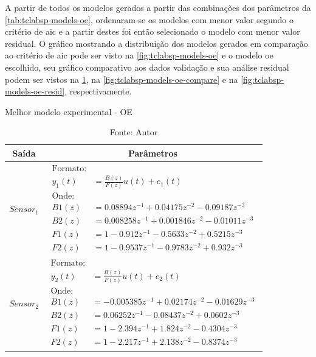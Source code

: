 A partir de todos os modelos gerados a partir das combinações dos parâmetros da \cref{tab:tclabsp-models-oe},
ordenaram-se os modelos com menor valor segundo o critério de \acrshort{aic} e a partir destes foi então
selecionado o modelo com menor valor residual.
O gráfico mostrando a distribuição dos modelos gerados em comparação ao critério de \acrshort{aic} pode ser
visto na \cref{fig:tclabsp-models-oe} e o modelo \acrshort{oe} escolhido, seu gráfico comparativo aos dados validação
e sua análise residual podem ser vistos na \cref{tab:tclabsp-model-oe}, na \cref{fig:tclabsp-models-oe-compare} e na
\cref{fig:tclabsp-models-oe-resid}, respectivamente.

\begin{table}[h]
	\centering
	\caption{Melhor modelo experimental - OE}
	\label{tab:tclabsp-model-oe}
	\begin{tabular}{c|c} \toprule
		{Saída}			&	{Parâmetros}									\\ \midrule
		$Sensor_1$			&
								$ 
									\begin{aligned}
										\text{Formato:}														\\
										y_1(t) &= \frac{B(z)}{F(z)}u(t) + e_1(t)							\\
										\text{Onde:}														\\
										B1(z) &= 0.08894 z^{-1} + 0.04175 z^{-2} - 0.09187 z^{-3}   		\\
										B2(z) &= 0.008258 z^{-1} + 0.001846 z^{-2} - 0.01011 z^{-3} 		\\
										F1(z) &= 1 - 0.912 z^{-1} - 0.5633 z^{-2} + 0.5215 z^{-3}  			\\
										F2(z) &= 1 - 0.9537 z^{-1} - 0.9783 z^{-2} + 0.932 z^{-3}    
									\end{aligned}
								$	
							\\ \midrule
		$Sensor_2$			&
								$ 
									\begin{aligned}
										\text{Formato:}														\\
										y_2(t) &= \frac{B(z)}{F(z)}u(t) + e_2(t)							\\
										\text{Onde:}														\\
										B1(z) &= -0.005385 z^{-1} + 0.02174 z^{-2} - 0.01629 z^{-3}    		\\
										B2(z) &= 0.06252 z^{-1} - 0.08437 z^{-2} + 0.0602 z^{-3}			\\
										F1(z) &= 1 - 2.394 z^{-1} + 1.824 z^{-2} - 0.4304 z^{-3} 			\\
										F2(z) &= 1 - 2.217 z^{-1} + 2.138 z^{-2} - 0.8374 z^{-3}  	
									\end{aligned}
								$
							\\ \bottomrule
	\end{tabular}
	\caption*{Fonte: Autor}
\end{table}

